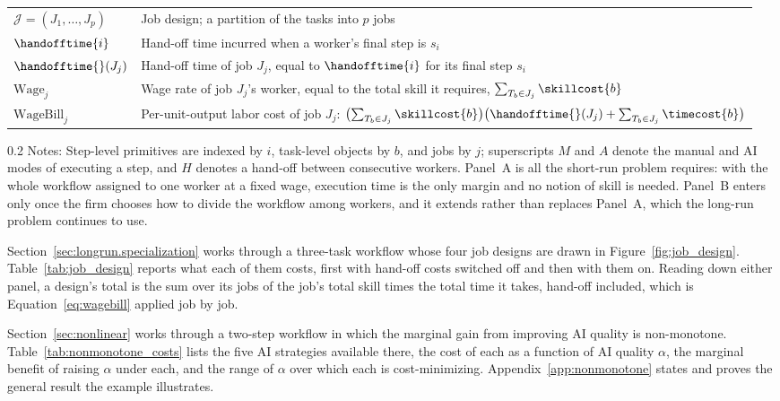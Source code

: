 \begin{table}[t]
\begin{tabularx}{\textwidth}{l X}
$\mathcal{J} = (J_1, \dotsc, J_p)$ & Job design; a partition of the tasks into $p$ jobs \\
\addlinespace
$\handofftime{i}$ & Hand-off time incurred when a worker's final step is $s_i$ \\
$\handofftime{}(J_j)$ & Hand-off time of job $J_j$, equal to $\handofftime{i}$ for its final step $s_i$ \\
\addlinespace
$\text{Wage}_j$ & Wage rate of job $J_j$'s worker, equal to the total skill it requires, $\sum_{T_b \in J_j} \skillcost{b}$ \\
$\text{WageBill}_j$ & Per-unit-output labor cost of job $J_j$: $\bigl(\sum_{T_b \in J_j} \skillcost{b}\bigr)\bigl(\handofftime{}(J_j) + \sum_{T_b \in J_j} \timecost{b}\bigr)$ \\
\bottomrule
\end{tabularx}

\begin{minipage}{1\linewidth}
\begin{spacing}{0.2}
{\fontsize{9.5pt}{10pt}\selectfont Notes: Step-level primitives are indexed by $i$, task-level objects by $b$, and jobs by $j$; superscripts $M$ and $A$ denote the manual and AI modes of executing a step, and $H$ denotes a hand-off between consecutive workers.
Panel~A is all the short-run problem requires: with the whole workflow assigned to one worker at a fixed wage, execution time is the only margin and no notion of skill is needed.
Panel~B enters only once the firm chooses how to divide the workflow among workers, and it extends rather than replaces Panel~A, which the long-run problem continues to use.}
\end{spacing}
\end{minipage}
\end{table}

Section~\ref{sec:longrun.specialization} works through a three-task workflow whose four job designs are drawn in Figure~\ref{fig:job_design}.
Table~\ref{tab:job_design} reports what each of them costs, first with hand-off costs switched off and then with them on.
Reading down either panel, a design's total is the sum over its jobs of the job's total skill times the total time it takes, hand-off included, which is Equation~\eqref{eq:wagebill} applied job by job.

Section~\ref{sec:nonlinear} works through a two-step workflow in which the marginal gain from improving AI quality is non-monotone.
Table~\ref{tab:nonmonotone_costs} lists the five AI strategies available there, the cost of each as a function of AI quality $\alpha$, the marginal benefit of raising $\alpha$ under each, and the range of $\alpha$ over which each is cost-minimizing.
Appendix~\ref{app:nonmonotone} states and proves the general result the example illustrates.

